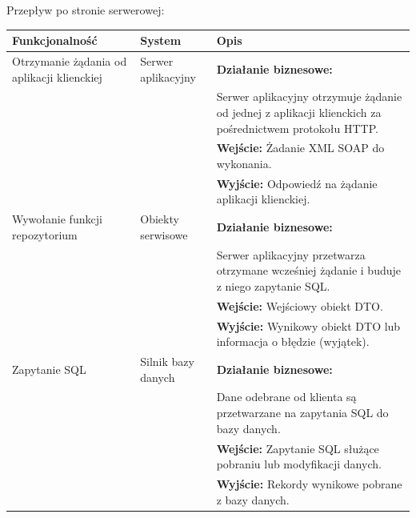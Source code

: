 \documentclass[10pt,a4paper]{article}
\begin{document}
Przepływ po stronie serwerowej:
\begin{table}[H]
	\begin{tabularx}{\textwidth}{|l|l|X|}
		\hline
		\textbf{Funkcjonalność} & \textbf{System} & \textbf{Opis} \\
		\hline
		Otrzymanie żądania od aplikacji klienckiej &
		Serwer aplikacyjny &
		\textbf{Działanie biznesowe:} \\
		& & Serwer aplikacyjny otrzymuje żądanie od jednej z aplikacji klienckich za pośrednictwem protokołu HTTP. \\
		& & \textbf{Wejście:} Żadanie XML SOAP do wykonania. \\
		& & \textbf{Wyjście:} Odpowiedź na żądanie aplikacji klienckiej. \\
		\hline
		Wywołanie funkcji repozytorium &
		Obiekty serwisowe &
		\textbf{Działanie biznesowe:} \\
		& & Serwer aplikacyjny przetwarza otrzymane wcześniej żądanie i buduje z niego zapytanie SQL. \\
		& & \textbf{Wejście:} Wejściowy obiekt DTO. \\
		& & \textbf{Wyjście:} Wynikowy obiekt DTO lub informacja o błędzie (wyjątek). \\
		\hline
		Zapytanie SQL &
		Silnik bazy danych &
		\textbf{Działanie biznesowe:} \\
		& & Dane odebrane od klienta są przetwarzane na zapytania SQL do bazy danych. \\
		& & \textbf{Wejście:} Zapytanie SQL służące pobraniu lub modyfikacji danych. \\
		& & \textbf{Wyjście:} Rekordy wynikowe pobrane z bazy danych. \\
		\hline
	\end{tabularx}
\end{table}

\newpage
\end{document}
